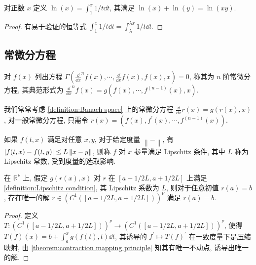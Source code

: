\begin{definition}[对数]
    对正数 \(x\) 定义 \(\ln (x) = \int_{1}^{x} 1/t \dd t\), 其满足 \(\ln (x) + \ln (y) = \ln (xy)\).

    \begin{proof}
        有易于验证的恒等式 \(\int_{1}^{x} 1/t \dd t = \int_{\lambda}^{\lambda x} 1/t \dd t\).
    \end{proof}
\end{definition}

\subsection{常微分方程}

\begin{definition}[常微分方程]
    对 \(f(x)\) 列出方程 \(\Gamma(\frac{\dd}{\dd x}^{n} f(x), \cdots, \frac{\dd}{\dd x} f(x), f(x),x) = 0\), 称其为 \(n\) 阶常微分方程,
    其典范形式为 \(\frac{\dd}{\dd x}^{n} f(x) = g(f(x),\cdots,f^{(n-1)}(x),x)\).
\end{definition}

\begin{remark}
    我们常常考虑 \ref{definition:Banach space} 上的常微分方程 \(\frac{\dd}{\dd x} r(x) = g(r(x),x)\), 对一般常微分方程, 只需令 \(r(x) = (f(x),f^\prime(x),\cdots,f^{(n-1)}(x))\).
\end{remark}

\begin{definition}[Lipschitz 条件]
    \label {definition:Lipschitz condition}
    如果 \(f(t,x)\) 满足对任意 \(x,y\), 对于给定度量 \(\left\|-\right\|\), 有 \(\abs{f(t,x) - f(t,y)} \leq L \left\|x - y\right\|\), 则称 \(f\) 对 \(x\) 参量满足 Lipschitz 条件, 其中 \(L\) 称为 Lipschitz 常数,
    受到度量的选取影响.
\end{definition}

\begin{theorem}
    在 \(\mathbb{R}^\nu\) 上, 假定 \(g(r(x),x)\) 对 \(r\) 在 \([a-1/2L,a+1/2L]\) 上满足 \ref{definition:Lipschitz condition}, 其 Lipschitz 系数为 \(L\), 则对于任意初值 \(r(a) = b\), 存在唯一的解 \(r \in {(C^{1} ([a-1/2L,a+1/2L]))}^{\nu}\) 满足 \(r(a) = b\).

    \begin{proof}
        定义 \(T : {(C^{1} ([a-1/2L,a+1/2L]))}^{\nu} \to {(C^{1} ([a-1/2L,a+1/2L]))}^{\nu}\), 使得 \(T(f)(x) = b + \int_{a}^{x} g(f(t),t) \dd t\), 其诱导的 \(f^\prime \mapsto T(f)^\prime\) 在一致度量下是压缩映射, 
        由 \ref{theorem:contraction mapping principle} 知其有唯一不动点, 诱导出唯一的解.
    \end{proof}
\end{theorem}

